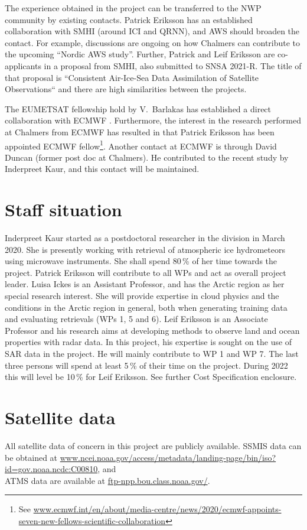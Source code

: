 \documentclass[12pt,oneside,a4paper]{article}
\begin{document}
The experience obtained in the project can be transferred to the NWP community
by existing contacts. Patrick Eriksson has an established collaboration with
SMHI (around ICI and QRNN), and AWS should broaden the contact. For example,
discussions are ongoing on how Chalmers can contribute to the upcoming
``Nordic AWS study''. Further, Patrick and Leif Eriksson are co-applicants in a
proposal from SMHI, also submitted to SNSA 2021-R. The title of that proposal
is ``Consistent Air-Ice-Sea Data Assimilation of Satellite Observations`` and
there are high similarities between the projects.

The EUMETSAT fellowship hold by V.\ Barlakas has established a direct
collaboration with ECMWF \citep{barlakas:intro:21}. Furthermore, the interest
in the research performed at Chalmers from ECMWF has resulted in
that Patrick
Eriksson has been appointed ECMWF fellow\footnote{See 
  \url{www.ecmwf.int/en/about/media-centre/news/2020/ecmwf-appoints-seven-new-fellows-scientific-collaboration}}.
Another contact at ECMWF is through David Duncan (former post doc at Chalmers).
He contributed to the recent study by Inderpreet Kaur, and this contact will be
maintained.
\section{Staff situation}
%
\label{sec:staff}
Inderpreet Kaur started as a postdoctoral researcher in the division in March
2020. She is presently working with retrieval of atmospheric ice hydrometeors
using microwave instruments. She shall spend 80\,\% of her time towards the
project. Patrick Eriksson will contribute to all WPs and act as overall project
leader. Luisa Ickes is an Assistant Professor, and has the Arctic region as her
special research interest. She will provide expertise in cloud physics and the
conditions in the Arctic region in general, both when generating training data
and evaluating retrievals (WPs 1, 5 and 6). Leif Eriksson is an Associate
Professor and his research aims at developing methods to observe land and ocean
properties with radar data. In this project, his expertise is sought on the use
of SAR data in the project. He will mainly contribute to WP 1 and WP 7. The
last three persons will spend at least 5\,\% of their time on the project.
During 2022 this will level be 10\,\% for Leif Eriksson. See further Cost
Specification enclosure.



\section{Satellite data}
%
All satellite data of concern in this project are publicly available. SSMIS
data can be obtained at
\url{www.ncei.noaa.gov/access/metadata/landing-page/bin/iso?id=gov.noaa.ncdc:C00810},
and\\ATMS data are available at \url{ftp-npp.bou.class.noaa.gov/}.

{\footnotesize
	
}
\end{document}
